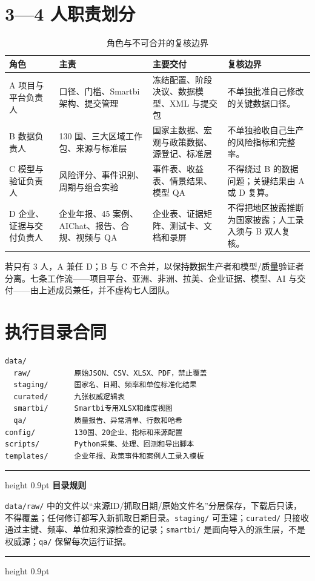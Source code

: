 \documentclass[UTF8,fontset=windows,12pt,openany]{ctexbook}
\newenvironment{warningbox}[1][]{%
  \par\medskip\noindent\begin{center}\begin{minipage}{0.93\textwidth}%
  \color{TextGray}\hrule height 0.9pt\vspace{0.45em}%
  \textbf{#1}\par\smallskip\color{black}%
}{%
  \par\vspace{0.35em}\color{TextGray}\hrule height 0.9pt%
  \end{minipage}\end{center}\medskip%
}
\newcommand{\File}[1]{{\small\nolinkurl{#1}}}
\begin{document}
\section{3—4 人职责划分}

\begin{longtable}{p{2.0cm}p{3.7cm}p{4.0cm}p{3.7cm}}
\caption{角色与不可合并的复核边界}\label{tab:roles}\\
\toprule
\textbf{角色} & \textbf{主责} & \textbf{主要交付} & \textbf{复核边界}\\
\midrule
A 项目与平台负责人 & 口径、门槛、Smartbi 架构、提交管理 & 冻结配置、阶段决议、数据模型、XML 与提交包 & 不单独批准自己修改的关键数据口径。\\
B 数据负责人 & 130 国、三大区域工作包、来源与标准层 & 国家主数据、宏观与政策数据、源登记、标准层 & 不单独验收自己生产的风险指标和完整率。\\
C 模型与验证负责人 & 风险评分、事件识别、周期与组合实验 & 事件表、收益表、情景结果、模型 QA & 不得绕过 B 的数据问题；关键结果由 A 或 D 复算。\\
D 企业、证据与交付负责人 & 企业年报、45 案例、AIChat、报告、合规、视频与 QA & 企业表、证据矩阵、测试卡、文档和录屏 & 不得把地区披露推断为国家披露；人工录入须与 B 双人复核。\\
\bottomrule
\end{longtable}

若只有 3 人，A 兼任 D；B 与 C 不合并，以保持数据生产者和模型/质量验证者分离。七条工作流——项目平台、亚洲、非洲、拉美、企业证据、模型、AI 与交付——由上述成员兼任，并不虚构七人团队。

\section{执行目录合同}

\begin{verbatim}
data/
  raw/          原始JSON、CSV、XLSX、PDF，禁止覆盖
  staging/      国家名、日期、频率和单位标准化结果
  curated/      九张权威逻辑表
  smartbi/      Smartbi专用XLSX和维度视图
  qa/           质量报告、异常清单、行数和哈希
config/         130国、20企业、指标和来源配置
scripts/        Python采集、处理、回测和导出脚本
templates/      企业年报、政策事件和案例人工录入模板
\end{verbatim}

\begin{warningbox}[目录规则]
\File{data/raw/} 中的文件以“来源ID/抓取日期/原始文件名”分层保存，下载后只读，不得覆盖；任何修订都写入新抓取日期目录。\File{staging/} 可重建；\File{curated/} 只接收通过主键、频率、单位和来源检查的记录；\File{smartbi/} 是面向导入的派生层，不是权威源；\File{qa/} 保留每次运行证据。
\end{warningbox}
\end{document}
